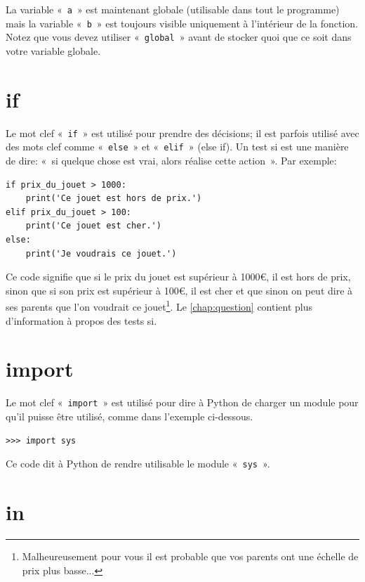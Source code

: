 La variable « \texttt{a} » est maintenant globale (utilisable dans tout le programme) mais la variable « \texttt{b} » est toujours visible uniquement à l'intérieur de la fonction. Notez que vous devez utiliser « \texttt{global} » avant de stocker quoi que ce soit dans votre variable globale.

\section*{if}

Le mot clef « \texttt{if} » est utilisé pour prendre des décisions; il est parfois utilisé avec des mots clef comme « \texttt{else} » et « \texttt{elif} » (else if). Un test si est une manière de dire: « si quelque chose est vrai, alors réalise cette action ». Par exemple:

\begin{Verbatim}[frame=single,rulecolor=\color{gray}]
if prix_du_jouet > 1000:
    print('Ce jouet est hors de prix.')
elif prix_du_jouet > 100:
    print('Ce jouet est cher.')
else:
    print('Je voudrais ce jouet.')
\end{Verbatim}

Ce code signifie que si le prix du jouet est supérieur à 1000{€}, il est hors de prix, sinon que si son prix est supérieur à 100{€}, il est cher et que sinon on peut dire à ses parents que l'on voudrait ce jouet\footnote{Malheureusement  pour vous il est probable que vos parents ont une échelle de prix plus basse...}.  Le \autoref{chap:question} contient plus d'information à propos des tests si.

\section*{import}
Le mot clef « \texttt{import} »  est utilisé pour dire à Python de charger un module pour qu'il puisse être utilisé, comme dans l'exemple ci-dessous.


\begin{Verbatim}[frame=single,rulecolor=\color{gray}]
>>> import sys
\end{Verbatim}

Ce code dit à Python de rendre utilisable le module « \texttt{sys} ».

\section*{in}


